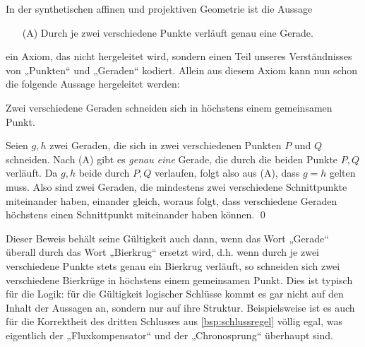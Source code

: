 \begin{bsp}[*]
    In der synthetischen affinen und projektiven Geometrie ist die Aussage
    \begin{itemize}
        \item[(A)] Durch je zwei verschiedene Punkte verläuft genau eine Gerade.
    \end{itemize}
    ein Axiom, das nicht hergeleitet wird, sondern einen Teil unseres Verständnisses von „Punkten“ und „Geraden“ kodiert. Allein aus diesem Axiom kann nun schon die folgende Aussage hergeleitet werden:
    \begin{satz}[*]
        Zwei verschiedene Geraden schneiden sich in höchstens einem gemeinsamen Punkt.
    \end{satz}
    \begin{bew}
        Seien $g,h$ zwei Geraden, die sich in zwei verschiedenen Punkten $P$ und $Q$ schneiden. Nach (A) gibt es \emph{genau eine} Gerade, die durch die beiden Punkte $P,Q$ verläuft. Da $g,h$ beide durch $P,Q$ verlaufen, folgt also aus (A), dass $g=h$ gelten muss. Also sind zwei Geraden, die mindestens zwei verschiedene Schnittpunkte miteinander haben, einander gleich, woraus folgt, dass verschiedene Geraden höchstens einen Schnittpunkt miteinander haben können. \qed
    \end{bew}
\end{bsp}


\begin{bem}
    Dieser Beweis behält seine Gültigkeit auch dann, wenn das Wort „Gerade“ überall durch das Wort „Bierkrug“ ersetzt wird, d.h. wenn durch je zwei verschiedene Punkte stets genau ein Bierkrug verläuft, so schneiden sich zwei verschiedene Bierkrüge in höchstens einem gemeinsamen Punkt. Dies ist typisch für die Logik: für die Gültigkeit logischer Schlüsse kommt es gar nicht auf den Inhalt der Aussagen an, sondern nur auf ihre Struktur. Beispielsweise ist es auch für die Korrektheit des dritten Schlusses aus \cref{bsp:schlussregel} völlig egal, was eigentlich der „Fluxkompensator“ und der „Chronosprung“ überhaupt sind.
\end{bem}


